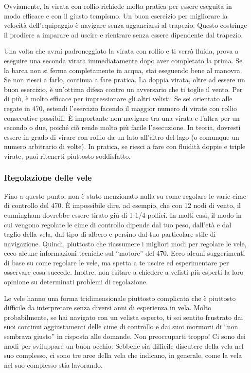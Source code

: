 Ovviamente, la virata con rollio richiede molta pratica per essere eseguita in
modo efficace e con il giusto tempismo. Un buon esercizio per migliorare la
velocità dell'equipaggio è navigare senza agganciarsi al trapezio. Questo
costringe il prodiere a imparare ad uscire e rientrare senza essere dipendente
dal trapezio.

Una volta che avrai padroneggiato la virata con rollio e ti verrà fluida, prova a eseguire una
seconda virata immediatamente dopo aver completato la prima. Se la barca non si
ferma completamente in acqua, stai eseguendo bene al manovra. Se non riesci a
farlo, continua a fare pratica. La doppia virata, oltre ad essere un buon
esercizio, è un'ottima difesa contro un avversario che ti toglie il vento. Per
di più, è molto efficace per impressionare gli altri velisti. Se sei
orientato alle regate in 470, estendi l'esercizio facendo il maggior numero di
virate con rollio consecutive possibili. È importante non navigare tra una
virata e l'altra per un secondo o due, poiché ciò rende molto più facile
l'esecuzione. In teoria, dovresti essere in grado di virare con rollio da un lato
all'altro del lago (o comunque un numero arbitrario di volte). In pratica, se
riesci a fare con fluidità doppie e triple
virate, puoi ritenerti piuttosto soddisfatto.

\subsubsection{Regolazione delle vele}
\label{subsubsec:RegolazioneDelleVele}
Fino a questo punto, non è stato menzionato nulla su come regolare le varie cime
di controllo del 470. È impossibile dire, ad esempio, che con 12 nodi di vento,
il cunningham dovrebbe essere tirato giù di 1-1/4 pollici. In molti casi, il
modo in cui vengono regolate le cime di controllo dipende dal tuo peso, dall'età
e dal taglio della vela, dal tipo di albero e persino dal tuo particolare stile
di navigazione. Quindi, piuttosto che riassumere i migliori modi per regolare le
vele, ecco alcune informazioni tecniche sul ``motore'' del 470. Ecco alcuni
suggerimenti di base su come regolare le vele, ma spetta a te uscire ed
esperimentare per osservare cosa succede. Inoltre, non esitare a chiedere a
velisti più esperti la loro opinione su determinati problemi di regolazione.

Le vele hanno una forma tridimensionale piuttosto complicata che è piuttosto
difficile da interpretare senza diversi anni di esperienza in vela. Molto
probabilmente, se hai navigato con un velista esperto, ti sei sentito frustrato dai
suoi continui aggiustamenti delle cime di controllo e dai suoi mormorii di ``non
sembrava giusto'' in risposta alle domande. Non preoccuparti troppo! Ci sono dei
modi per sviluppare un buon occhio. Sebbene sia difficile discutere della vela
nel suo complesso, ci sono tre aree della vela che indicano, in generale, come
la vela nel suo complesso stia lavorando.

